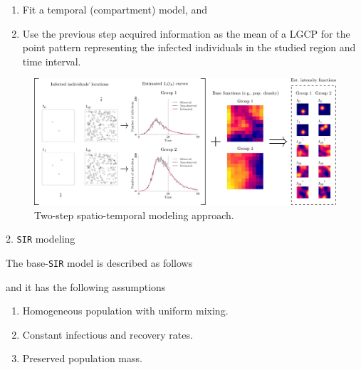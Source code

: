 \documentclass[12pt]{beamer}
\begin{document}
\begin{frame}[t]
\begin{columns}[t]
\begin{column}{0.24175\textwidth}
\begin{block}{}
			\begin{enumerate}
				\justifying
				\item Fit a temporal (compartment) model, and
				\item Use the previous step acquired information as the mean of a LGCP for the point pattern representing the infected individuals in the studied region and time interval.
			\end{enumerate}
		
			\begin{figure}[!ht]
				\centering
				\includegraphics[width = 1\textwidth]{Images/diagram.png}\vspace{-6pt}
				\caption{\justifying Two-step spatio-temporal modeling approach.}
				\label{fig:diagram}
			\end{figure}
		
			\textcolor{strong-blue}{\Large 2. \texttt{SIR} modeling} \justifying \vspace{12pt}

			The base-\texttt{SIR} model \citep{kermack1927contribution} is described as follows\vspace{-15pt}
			\begin{figure}[!ht]
			\end{figure}
			and it has the following assumptions \vspace{6pt}
			\begin{enumerate}
				\item Homogeneous population with uniform mixing.
				\item Constant infectious and recovery rates.
				\item Preserved population mass.
			\end{enumerate}
			

\end{block}
\end{column}
\end{columns}
\end{frame}
\end{document}
